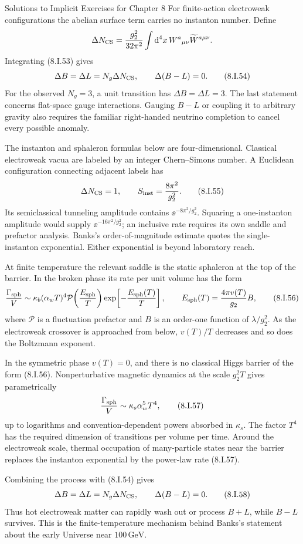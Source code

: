 \begin{bankssolutions}{Solutions to Implicit Exercises for Chapter 8}
For finite-action electroweak configurations the abelian surface term carries
no instanton number.  Define
\[
 \Delta N_{\rm CS}=\frac{g_2^2}{32\pi^2}
 \int\mathop{}\!\mathrm{d}^4x\,W^a{}_{\mu\nu}\widetilde W^{a\mu\nu}.
\]
Integrating (8.I.53) gives
\[
 \Delta B=\Delta L=N_g\Delta N_{\rm CS},
 \qquad \Delta(B-L)=0. \tag{8.I.54}
\]
For the observed $N_g=3$, a unit transition has $\Delta B=\Delta L=3$.
The last statement concerns flat-space gauge interactions.  Gauging $B-L$
or coupling it to arbitrary gravity also requires the familiar right-handed
neutrino completion to cancel every possible anomaly.

The instanton and sphaleron formulas below are four-dimensional.
Classical electroweak vacua are labeled by an integer Chern--Simons number.
A Euclidean configuration connecting adjacent labels has
\[
 \Delta N_{\rm CS}=1,
 \qquad S_{\rm inst}=\frac{8\pi^2}{g_2^2}. \tag{8.I.55}
\]
Its semiclassical tunneling amplitude contains
$\ee^{-8\pi^2/g_2^2}$.  Squaring a one-instanton amplitude would supply
$\ee^{-16\pi^2/g_2^2}$; an inclusive rate requires its own saddle and
prefactor analysis.  Banks's order-of-magnitude estimate quotes the
single-instanton exponential.  Either exponential is beyond laboratory
reach.

At finite temperature the relevant saddle is the static sphaleron at the top
of the barrier.  In the broken phase its rate per unit volume has the form
\[
 \frac{\Gamma_{\rm sph}}V
 \sim \kappa_b(\alpha_wT)^4
 \mathcal P\!\left(\frac{E_{\rm sph}}T\right)
 \exp\!\left[-\frac{E_{\rm sph}(T)}T\right],
 \qquad
 E_{\rm sph}(T)=\frac{4\pi v(T)}{g_2}B, \tag{8.I.56}
\]
where $\mathcal P$ is a fluctuation prefactor and $B$ is an order-one function
of $\lambda/g_2^2$.  As the electroweak crossover is approached from below,
$v(T)/T$ decreases and so does the Boltzmann exponent.

In the symmetric phase $v(T)=0$, and there is no classical Higgs barrier of
the form (8.I.56).  Nonperturbative magnetic dynamics at the scale
$g_2^2T$ gives parametrically
\[
 \frac{\Gamma_{\rm sph}}V\sim\kappa_s\alpha_w^5T^4, \tag{8.I.57}
\]
up to logarithms and convention-dependent powers absorbed in $\kappa_s$.
The factor $T^4$ has the required dimension of transitions per volume per
time.  Around the electroweak scale, thermal occupation of many-particle
states near the barrier replaces the instanton exponential by the power-law
rate (8.I.57).

Combining the process with (8.I.54) gives
\[
 \Delta B=\Delta L=N_g\Delta N_{\rm CS},
 \qquad \Delta(B-L)=0. \tag{8.I.58}
\]
Thus hot electroweak matter can rapidly wash out or process $B+L$, while
$B-L$ survives.  This is the finite-temperature mechanism behind Banks's
statement about the early Universe near $100\,\mathrm{GeV}$.


\end{bankssolutions}
